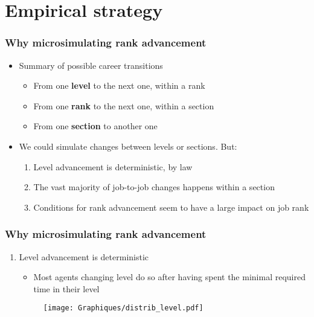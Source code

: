 \documentclass[xcolor=table,ignorenonframetext,12pt]{beamer}
\newcounter{sauvegardeenumi}
\newcommand{\asuivre}{\setcounter{sauvegardeenumi}{\theenumi}}
\begin{document}
\section{Empirical strategy}

\begin{frame}
\frametitle{Why microsimulating rank advancement}
\begin{itemize}
	\item Summary of possible career transitions
\begin{itemize}
	\item From one \textbf{level} to the next one, within a rank
	\item From one \textbf{rank} to the next one, within a section
	\item From one \textbf{section} to another one
\end{itemize}
	\item We could simulate changes between levels or sections. But:
	\begin{enumerate}
		\item Level advancement is deterministic, by law
		\item The vast majority of job-to-job changes happens within a section %
		\item Conditions for rank advancement seem to have a large impact on job rank
	\end{enumerate}
\end{itemize}
\end{frame}





\begin{frame}
\frametitle{Why microsimulating rank advancement}
	\begin{enumerate}
	\item Level advancement is deterministic
	\begin{itemize}
	\item Most agents changing level do so after having spent the minimal required time in their level
	\end{itemize}
	\vspace{-0.1cm}
	\begin{center}
		\begin{figure}
			\texttt{[image: Graphiques/distrib\_level.pdf]}
		\end{figure}
	\end{center}
	\asuivre
\end{enumerate}
\end{frame}
\end{document}
